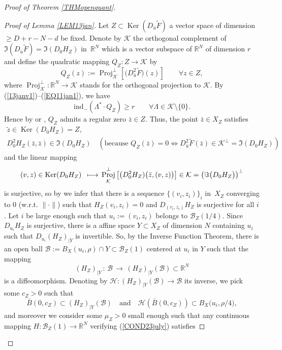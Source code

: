 \documentclass[JEP,XML,SOM,Unicode,NoFloatCountersInSection,published]{cedram}
\newcommand\mto{\mathchoice{\longmapsto}{\mapsto}{\mapsto}{\mapsto}}
\DeclareMathOperator{\Ker}{Ker}
\DeclareMathOperator{\Proj}{Proj}
\newcommand\R{\mathbb R}
\theoremstyle{definition}
\begin{document}
\begin{proof}[Proof of Theorem \ref{THMopenquant}]
\begin{proof}[Proof of Lemma \ref{LEM13jan}]
Let $Z\subset \Ker (D_{\bar{u}} \tilde{F})$ a vector space of dimension $\geq D+r-N-d$ be fixed. Denote by $\mathcal{K}$ the orthogonal complement of $ \Im (D_{\bar{u}} \tilde{F})=\Im (D_{0} H_Z)$ in~$\R^N$ which is a vector subspace of $\R^N$ of dimension $r$ and define the quadratic mapping $Q_Z: Z \to \mathcal{K}$ by
\[
Q_Z(z) := \Proj^{\perp}_{\mathcal{K}} \left[ \bigl(D^2_{\bar{u}} \tilde{F} \bigr)(z) \right] \qquad \forall z \in Z,
\]
where $\Proj^{\perp}_{\mathcal{K}} : \R^N \to \mathcal{K}$ stands for the orthogonal projection to $\mathcal{K}$. By (\ref{13janv1})--(\ref{EQ11jan1}), we have
\[
\mathrm{ind}_- \left(\Lambda^* \cdot Q_Z \right) \geq r \qquad \forall \Lambda \in \mathcal{K} \setminus \{0\}.
\]
Hence by \cite[Lem.\,20.8, p.\,301]{as04} or \cite[Lem.\,B.6, p.\,130]{riffordbook}, $Q_Z$ admits a regular zero $\bar{z}\in Z$. Thus, the point $\bar{z}\in X_Z$ satisfies
\begin{gather*}
\tilde{z} \in \Ker(D_0H_Z) = Z,
\\
D_0^2H_Z \left(\bar{z},\bar{z}\right) \in \Im (D_{0} H_Z) \quad (\text{because } Q_Z(\bar{z})=0 \Leftrightarrow D^2_{\bar{u}}\tilde{F} (\bar{z})\in \mathcal{K}^{\perp}=\Im (D_{0} H_Z))
\end{gather*}
and the linear mapping
\[
(v,z) \in \Ker(D_0H_Z) \, \mto \, \Proj^{\perp}_{\mathcal{K}}\left[ \bigl(D^2_{0} H_Z) \bigl(\bar{z},(v,z) \bigr)\right] \in \mathcal{K} =\left(\Im \bigl(D_{0} H_Z\bigr)\right)^{\perp}
\]
is surjective, so by \cite[Lem.\,B.5, p.\,129]{riffordbook} we infer that there is a sequence $\{(v_i,z_i)\}_i$ in~$X_Z$ converging to $0$ (w.r.t. $\|\cdot\|$) such that $H_Z(v_i,z_i)=0$ and $D_{(v_i,z_i)}H_Z$ is surjective for all $i$. Let $i$ be large enough such that $u_i:=(v_i,z_i)$ belongs to $\mathcal{B}_Z(1/4)$. Since $D_{u_i}H_Z$ is surjective, there is a affine space $Y \subset X_Z$ of dimension $N$ containing $u_i$ such that $D_{u_i}(H_Z)_{\vert Y}$ is invertible. So, by the Inverse Function Theorem, there is an open ball $\mathcal{B}:=B_X(u_i,\rho)\cap Y \subset \mathcal{B}_Z(1)$ centered at $u_i$ in $Y$
such that the mapping
\[
(H_Z)_{\vert Y} \, : \, \mathcal{B} \, \to \, (H_Z)_{\vert Y} (\mathcal{B}) \subset \R^N
\]
is a diffeomorphism. Denoting by $\mathcal{H} : (H_Z)_{\vert Y} (\mathcal{B}) \to \mathcal{B}$ its inverse, we pick some $c_Z>0$ such that
\[
\bar{B}(0,c_Z) \subset (H_Z)_{\vert Y} (\mathcal{B}) \quad \text{and} \quad
\mathcal{H}\left(\bar{B}(0,c_Z)\right) \subset B_X\bigl(u_i,\rho/4\bigr),
\]
and moreover we consider some $\mu_Z>0$ small enough such that any continuous mapping $H : \mathcal{B}_Z(1) \to \R^N$ verifying (\ref{COND23july}) satisfies

\end{proof}
\end{proof}
\end{document}
